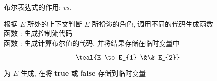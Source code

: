 \begin{frame}{}
\end{frame}

\begin{frame}{}
  \begin{center}
    {\Large 布尔表达式的作用:  \emph{vs.} }

    \vspace{0.50cm}

    \pause
    \vspace{0.50cm}
    根据 $E$ 所处的上下文判断 $E$ 所扮演的角色, 调用不同的代码生成函数 \\[15pt]

    函数 : 生成控制流代码 \\[6pt]
    函数 : 生成计算布尔值的代码, 并将结果存储在临时变量中
  \end{center}
\end{frame}

\begin{frame}{}
  \begin{center}

    \[
      \teal{E \to E_{1} \&\& E_{2}}
    \]

    为 $E$ 生成,
    在将 {\bf true} 或 {\bf false} 存储到临时变量
  \end{center}
\end{frame}




